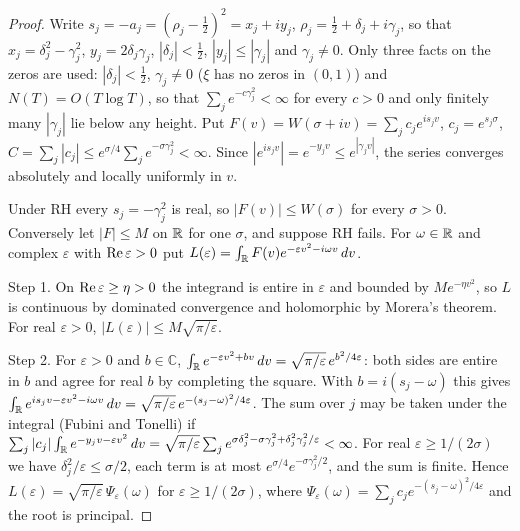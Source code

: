 \begin{proof}
Write $s_j=-a_j=(\rho_j-\frac12)^2=x_j+iy_j$, $\rho_j=\frac12+\delta_j+i\gamma_j$, so that $x_j=\delta_j^2-\gamma_j^2$, $y_j=2\delta_j\gamma_j$, $|\delta_j|<\frac12$, $|y_j|\le|\gamma_j|$ and $\gamma_j\ne0$. Only three facts on the zeros are used: $|\delta_j|<\frac12$, $\gamma_j\ne0$ ($\xi$ has no zeros in $(0,1)$) and $N(T)=O(T\log T)$, so that $\sum_je^{-c\gamma_j^2}<\infty$ for every $c>0$ and only finitely many $|\gamma_j|$ lie below any height. Put $F(v)=W(\sigma+iv)=\sum_jc_je^{is_jv}$, $c_j=e^{s_j\sigma}$, $C=\sum_j|c_j|\le e^{\sigma/4}\sum_je^{-\sigma\gamma_j^2}<\infty$. Since $|e^{is_jv}|=e^{-y_jv}\le e^{|\gamma_jv|}$, the series converges absolutely and locally uniformly in $v$.

Under RH every $s_j=-\gamma_j^2$ is real, so $|F(v)|\le W(\sigma)$ for every $\sigma>0$. Conversely let $|F|\le M$ on $\mathbb{R}$ for one $\sigma$, and suppose RH fails. For $\omega\in\mathbb{R}$ and complex $\varepsilon$ with $\operatorname{Re}\varepsilon>0$ put $L(\varepsilon)=\int_{\mathbb{R}} F(v)e^{-\varepsilon v^2-i\omega v}\,dv$.

Step 1. On $\operatorname{Re}\varepsilon\ge\eta>0$ the integrand is entire in $\varepsilon$ and bounded by $Me^{-\eta v^2}$, so $L$ is continuous by dominated convergence and holomorphic by Morera's theorem. For real $\varepsilon>0$, $|L(\varepsilon)|\le M\sqrt{\pi/\varepsilon}$.

Step 2. For $\varepsilon>0$ and $b\in\mathbb C$, $\int_{\mathbb{R}} e^{-\varepsilon v^2+bv}\,dv=\sqrt{\pi/\varepsilon}\,e^{b^2/4\varepsilon}$: both sides are entire in $b$ and agree for real $b$ by completing the square. With $b=i(s_j-\omega)$ this gives $\int_{\mathbb{R}} e^{is_jv-\varepsilon v^2-i\omega v}\,dv=\sqrt{\pi/\varepsilon}\,e^{-(s_j-\omega)^2/4\varepsilon}$. The sum over $j$ may be taken under the integral (Fubini and Tonelli) if $\sum_j|c_j|\int_{\mathbb{R}} e^{-y_jv-\varepsilon v^2}\,dv=\sqrt{\pi/\varepsilon}\sum_je^{\sigma\delta_j^2-\sigma\gamma_j^2+\delta_j^2\gamma_j^2/\varepsilon}<\infty$. For real $\varepsilon\ge1/(2\sigma)$ we have $\delta_j^2/\varepsilon\le\sigma/2$, each term is at most $e^{\sigma/4}e^{-\sigma\gamma_j^2/2}$, and the sum is finite. Hence $L(\varepsilon)=\sqrt{\pi/\varepsilon}\,\Psi_\varepsilon(\omega)$ for $\varepsilon\ge1/(2\sigma)$, where $\Psi_\varepsilon(\omega)=\sum_jc_je^{-(s_j-\omega)^2/4\varepsilon}$ and the root is principal.


\end{proof}
